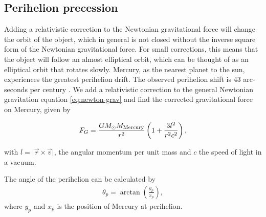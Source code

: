 \documentclass[../main.tex]{subfiles}
\begin{document}
\subsection{Perihelion precession}

Adding a relativistic correction to the Newtonian gravitational force will change the orbit of the object, which in general is not closed without the inverse square form of the Newtonian gravitational force. For small corrections, this means that the object will follow an almost elliptical orbit, which can be thought of as an elliptical orbit that rotates slowly. Mercury, as the nearest planet to the sun, experiences the greatest perihelion drift. The observed perihelion shift is 43 arc-seconds per century \cite{Pollock2003}. We add a relativistic correction to the general Newtonian gravitation equation \cref{eq:newton-grav} and find the corrected gravitational force on Mercury, given by

\begin{align}
    F_G = \frac{G M_\odot M_{\textnormal{Mercury}}}{r^2} \left(1 + \frac{3l^2}{r^2 c^2} \right),
    \label{eq:rel-correction}
\end{align}

with $l = \vert \vec{r} \times \vec{v} \vert$, the angular momentum per unit mass and $c$ the speed of light in a vacuum.

The angle of the perihelion can be calculated by
\begin{align*}
    \theta_p=\arctan\left(\frac{y_p}{x_p}\right),
\end{align*} where $y_p$ and $x_p$ is the position of Mercury at perihelion. 
\end{document}
